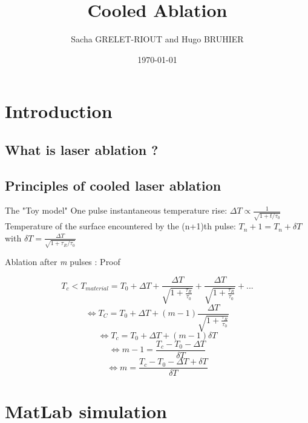 \documentclass[11pt]{beamer}
\author{Sacha GRELET-RIOUT and Hugo BRUHIER}
\title{Cooled Ablation}
\institute{Télécom Saint-Étienne}
\date{\today}
\begin{document}

\begin{frame}
\titlepage
\end{frame}

\begin{frame}
\tableofcontents
\end{frame}

\section{Introduction}
\subsection{What is laser ablation ?}
\begin{frame}{}

\end{frame}

\subsection{Principles of cooled laser ablation}
\begin{frame}{The "Toy model"}
One pulse instantaneous temperature rise:
$
\Delta T \propto \frac{1}{\sqrt{1+t/\tau_0}}
$
Temperature of the surface encountered by the (n+1)th pulse:
$
T_n+1 = T_n+\delta T
$
 with 
$
\delta T = \frac{\Delta T}{\sqrt{1+\tau_R / \tau_0}} 
$

\end{frame}

\begin{frame}{Ablation after \emph{m} pulses : Proof}

$$
T_c < T_{material} = T_0 + \Delta T + \frac{\Delta T}{\sqrt{1+\frac{\tau_R}{\tau_0}}} + \frac{\Delta T}{\sqrt{1+\frac{\tau_R}{\tau_0}}} + ...
$$
$$
\Leftrightarrow T_C = T_0 + \Delta T + (m-1) \frac{\Delta T}{\sqrt{1+\frac{\tau_R}{\tau_0}}}
$$
$$
\Leftrightarrow T_c = T_0 + \Delta T + (m-1) \delta T
$$
$$
\Leftrightarrow m-1 = \frac{T_c - T_0 - \Delta T}{\delta T}
$$
\begin{equation}
\Leftrightarrow \boxed{m = \frac{T_c - T_0 - \Delta T + \delta T}{\delta T}}
\end{equation}


\end{frame}


\section{MatLab simulation}
\end{document}
